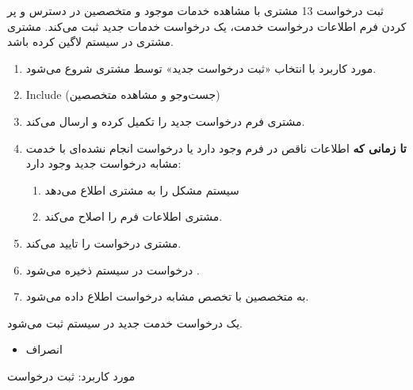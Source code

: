 {
\usecase
{ثبت درخواست}
{13}
{
	مشتری با مشاهده خدمات موجود و متخصصین در دسترس و پر کردن فرم اطلاعات درخواست خدمت، یک درخواست خدمات جدید ثبت می‌کند.
}
{مشتری}
{}
{
	مشتری در سیستم لاگین کرده باشد.
}
{
	\vspace*{-0.6cm}
	\begin{enumerate}
		\item 
		مورد کاربرد با انتخاب «ثبت درخواست جدید» توسط مشتری شروع می‌شود.
		\item 
		Include (جست‌وجو و مشاهده متخصصین)
		\item 
		مشتری فرم درخواست جدید را تکمیل کرده و ارسال می‌کند.
				\item 
		\textbf{تا زمانی که}
		اطلاعات ناقص در فرم وجود دارد یا درخواست انجام نشده‌ای با خدمت مشابه درخواست جدید وجود دارد:
		\begin{enumerate}[label=\theenumi.\arabic*.]
						\item 
سیستم مشکل را به مشتری اطلاع می‌دهد
			\item 
			مشتری اطلاعات فرم را اصلاح می‌کند.
		\end{enumerate}
		\item
مشتری درخواست را تایید می‌کند.
		\item 
		درخواست در سیستم ذخیره می‌شود .
		\item 
		به متخصصین با تخصص مشابه درخواست اطلاع داده می‌شود.
		
	\end{enumerate}
}
{یک درخواست خدمت جدید در سیستم ثبت می‌شود.}
{
	\begin{itemize}
		\vspace*{-0.6cm}
		\item انصراف
	\end{itemize}
}
{
	مورد کاربرد: ثبت درخواست
}


}









